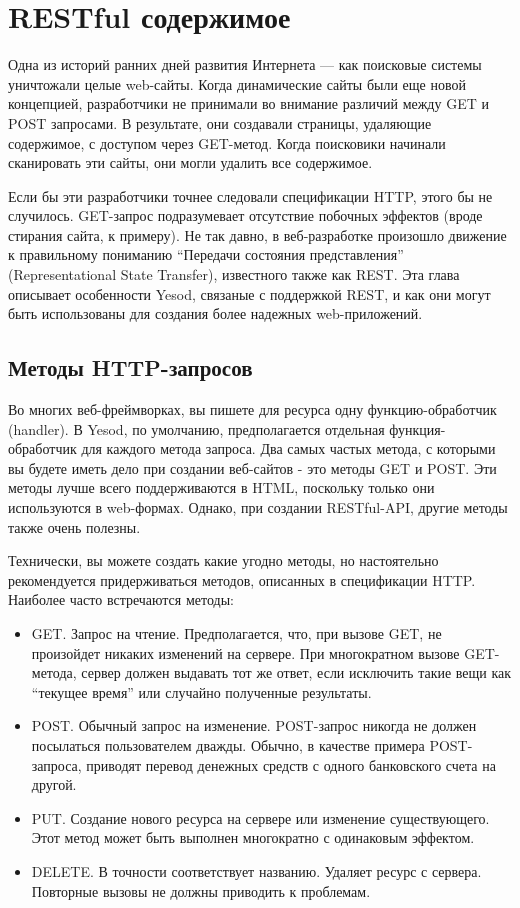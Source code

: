 \chapter{RESTful содержимое}

Одна из историй ранних дней развития Интернета --- как поисковые системы уничтожали целые web-сайты. Когда динамические сайты были еще новой концепцией, разработчики не принимали во внимание различий между GET и POST запросами. В результате, они создавали страницы, удаляющие содержимое, с доступом через GET-метод. Когда поисковики начинали сканировать эти сайты, они могли удалить все содержимое.

Если бы эти разработчики точнее следовали спецификации HTTP, этого бы не случилось. GET-запрос подразумевает отсутствие побочных эффектов (вроде стирания сайта, к примеру). Не так давно, в веб-разработке произошло движение к правильному пониманию “Передачи состояния представления” (Representational State Transfer), известного также как REST. Эта глава описывает особенности Yesod, связаные с поддержкой REST, и как они могут быть использованы для создания более надежных web-приложений.

\section{Методы HTTP-запросов}

Во многих веб-фреймворках, вы пишете для ресурса одну функцию-обработчик (handler). В Yesod, по умолчанию, предполагается отдельная функция-обработчик для каждого метода запроса. Два самых частых метода, с которыми вы будете иметь дело при создании веб-сайтов - это методы GET и POST. Эти методы лучше всего поддерживаются в HTML, поскольку только они используются в web-формах. Однако, при создании RESTful-API, другие методы также очень полезны.

Технически, вы можете создать какие угодно методы, но настоятельно рекомендуется придерживаться методов, описанных в спецификации HTTP. Наиболее часто встречаются методы:
\begin{itemize}
 \item GET. Запрос на чтение. Предполагается, что, при вызове GET, не произойдет никаких изменений на сервере. При многократном вызове GET-метода, сервер должен выдавать тот же ответ, если исключить такие вещи как “текущее время” или случайно полученные результаты. 
 \item POST. Обычный запрос на изменение. POST-запрос никогда не должен посылаться пользователем дважды. Обычно, в качестве примера POST-запроса, приводят перевод денежных средств с одного банковского счета на другой.
 \item PUT. Создание нового ресурса на сервере или изменение существующего. Этот метод может быть выполнен многократно с одинаковым эффектом.
 \item DELETE. В точности соответствует названию. Удаляет ресурс с сервера. Повторные вызовы не должны приводить к проблемам.
\end{itemize}

